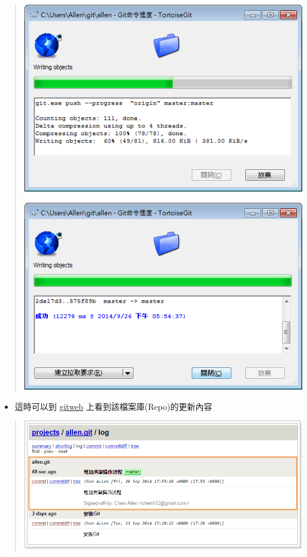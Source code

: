 \documentclass[letterpaper,10pt,english]{sphinxmanual}
\begin{document}
\begin{quote}

\includegraphics{tortoisegit-push-007.png}

\includegraphics{tortoisegit-push-008.png}
\end{quote}
\begin{itemize}
\item {} 
這時可以到 \href{http://allen.go38.net/cgi-bin/gitweb.cgi}{gitweb} 上看到該檔案庫(Repo)的更新內容

\end{itemize}
\begin{quote}

\includegraphics{tortoisegit-push-009.png}
\end{quote}
\end{document}
